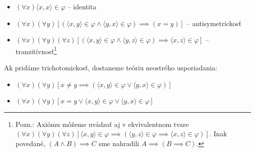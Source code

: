 \begin{priklad}
\noindent
    \begin{itemize}
        \item[1.] $(\forall x) \langle x,x\rangle \in \varphi$ -- identita

        \item[2.] $(\forall x) (\forall y) [
            (\langle x,y \rangle \in \varphi \land
             \langle y,x \rangle \in \varphi) \implies (x=y)]$ -- 
             antisymetrickosť

        \item[3.] $(\forall x) (\forall y) (\forall z)
            [( \langle x,y \rangle \in \varphi \land 
               \langle y,z \rangle \in \varphi) \implies
               \langle x,z \rangle \in \varphi]$ --
               tranzitívnosť\footnote{Pozn.: Axiómu môžeme uvádzať aj
               v ekvivalentnom tvare
                $(\forall x) (\forall y) (\forall z)
                [ \langle x,y \rangle \in \varphi \implies (
                    \langle y,z \rangle \in \varphi \implies
                    \langle x,z \rangle \in \varphi)]$. Inak povedané,
                    $(A \land B) \implies C$ sme nahradili
                    $A \implies (B \implies C)$.
               }
    \end{itemize}
    Ak pridáme trichotomickosť, dostaneme teóriu neostrého
    usporiadania:
    \begin{itemize}
        \item[4.] $(\forall x) (\forall y) [x \not=y \implies
            (\langle x,y \rangle \in \varphi \lor 
             \langle y,x \rangle \in \varphi)]$

        \item[4'] $(\forall x) (\forall y) [x = y \lor
             \langle x,y \rangle \in \varphi \lor 
             \langle y,x \rangle \in \varphi]$
    \end{itemize}
\end{priklad}

